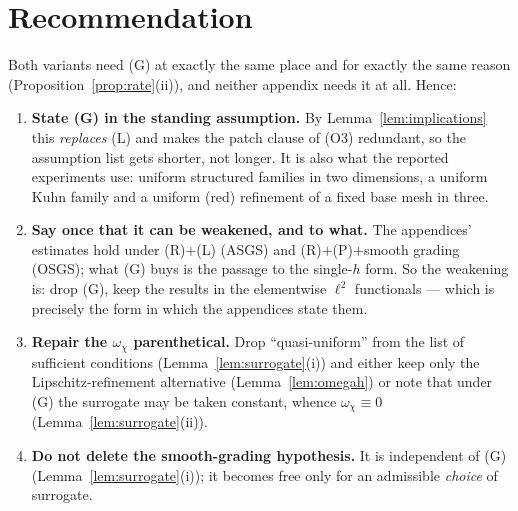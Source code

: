 \documentclass[11pt,a4paper]{article}
\theoremstyle{definition}
\begin{document}
\section{Recommendation}\label{sec:recommendation}

Both variants need (G) at exactly the same place and for exactly the same reason
(Proposition~\ref{prop:rate}(ii)), and neither appendix needs it at all. Hence:

\begin{enumerate}
\item \textbf{State (G) in the standing assumption.} By Lemma~\ref{lem:implications} this
\emph{replaces} (L) and makes the patch clause of (O3) redundant, so the assumption list gets
shorter, not longer. It is also what the reported experiments use: uniform structured families in two
dimensions, a uniform Kuhn family and a uniform (red) refinement of a fixed base mesh in three.
\item \textbf{Say once that it can be weakened, and to what.} The appendices' estimates hold under
(R)$+$(L) (ASGS) and (R)$+$(P)$+$smooth grading (OSGS); what (G) buys is the passage to the
single-$h$ form. So the weakening is: drop (G), keep the results in the elementwise $\ell^2$
functionals --- which is precisely the form in which the appendices state them.
\item \textbf{Repair the $\omega_\chi$ parenthetical.} Drop ``quasi-uniform'' from the list of
sufficient conditions (Lemma~\ref{lem:surrogate}(i)) and either keep only the Lipschitz-refinement
alternative (Lemma~\ref{lem:omegah}) or note that under (G) the surrogate may be taken constant,
whence $\omega_\chi\equiv0$ (Lemma~\ref{lem:surrogate}(ii)).
\item \textbf{Do not delete the smooth-grading hypothesis.} It is independent of (G)
(Lemma~\ref{lem:surrogate}(i)); it becomes free only for an admissible \emph{choice} of surrogate.
\end{enumerate}
\end{document}
